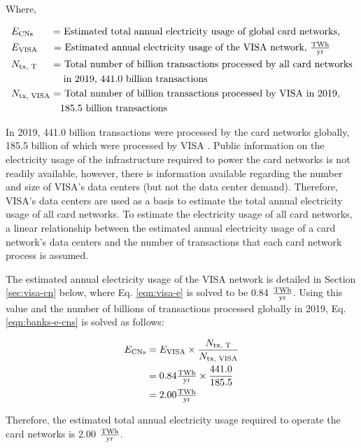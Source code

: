 \noindent
Where,

\begin{align*}
  &E_\textrm{CNs} \textrm{ \quad \ \ = Estimated total annual electricity usage of global card networks, } \\
  &E_\textrm{VISA} \textrm{\quad \ \ = Estimated annual electricity usage of the VISA network, $\tfrac{ \textrm{{T}Wh} } { \textrm{yr} }$ } \\
  &N_\textrm{tx, T} \textrm{\quad \ \ = Total number of billion transactions processed by all card networks} \\
  &\textrm{\qquad \qquad \ \ \ \  in 2019, 441.0 billion transactions} \\
  &N_\textrm{tx, VISA} \textrm{ = Total number of billion transactions processed by VISA in 2019, } \\
  &\textrm{\qquad \qquad \ \ \ 185.5 billion transactions }
\end{align*}

In 2019, 441.0 billion transactions were processed by the card networks globally, 185.5 billion of which were processed by VISA \cite{cn-tx}.
Public information on the electricity usage of the infrastructure required to power the card networks is not readily available, however, there is information available regarding the number and size of VISA's data centers (but not the data center demand).
Therefore, VISA's data centers are used as a basis to estimate the total annual electricity usage of all card networks.
To estimate the electricity usage of all card networks, a linear relationship between the estimated annual electricity usage of a card network's data centers and the number of transactions that each card network process is assumed.

The estimated annual electricity usage of the VISA network is detailed in Section \ref{sec:visa-cn} below, where Eq. \eqref{eqn:visa-e} is solved to be 0.84 $\tfrac{ \textrm{{T}Wh} } { \textrm{yr} }$.
Using this value and the number of billions of transactions processed globally in 2019, Eq. \eqref{eqn:banks-e-cns} is solved as follows:

\begin{align}\label{eqn:banks-e-cns-res}
  E_\textrm{CNs} &= E_\textrm{VISA} \times \frac{ N_\textrm{tx, T} }{ N_\textrm{tx, VISA} } \nonumber \\
                 &= 0.84 \tfrac{ \textrm{{T}Wh} } { \textrm{yr} } \times \frac{441.0} {185.5} \nonumber \\
                 &= 2.00 \tfrac{ \textrm{{T}Wh} } { \textrm{yr} }
\end{align}

Therefore, the estimated total annual electricity usage required to operate the card networks is 2.00 $\tfrac{ \textrm{{T}Wh} } { \textrm{yr} }$.
